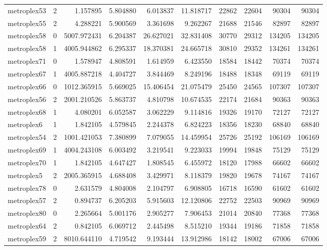 \begin{longtable}{|l|r|r|r|r|r|r|r|r|r|}
metroplex53 & 2 & 1.157895 & 5.804880 & 6.013837 & 11.818717 & 22862 & 22604 & 90304 & 90304 \\
metroplex55 & 2 & 4.288221 & 5.900569 & 3.361698 & 9.262267 & 21688 & 21546 & 82897 & 82897 \\
metroplex58 & 0 & 5007.972431 & 6.204387 & 26.627021 & 32.831408 & 30770 & 29312 & 134205 & 134205 \\
metroplex58 & 1 & 4005.944862 & 6.295337 & 18.370381 & 24.665718 & 30810 & 29352 & 134261 & 134261 \\
metroplex71 & 0 & 1.578947 & 4.808591 & 1.614959 & 6.423550 & 18584 & 18442 & 70374 & 70374 \\
metroplex67 & 1 & 4005.887218 & 4.404727 & 3.844469 & 8.249196 & 18488 & 18348 & 69119 & 69119 \\
metroplex66 & 0 & 1012.365915 & 5.669025 & 15.406454 & 21.075479 & 25450 & 24565 & 107307 & 107307 \\
metroplex56 & 2 & 2001.210526 & 5.863737 & 4.810798 & 10.674535 & 22174 & 21684 & 90363 & 90363 \\
metroplex68 & 1 & 4.080201 & 6.052587 & 3.062229 & 9.114816 & 19326 & 19170 & 72127 & 72127 \\
metroplex6 & 1 & 1.842105 & 4.579845 & 2.244378 & 6.824223 & 18356 & 18230 & 68840 & 68840 \\
metroplex54 & 2 & 1001.421053 & 7.380899 & 7.079055 & 14.459954 & 25726 & 25192 & 106169 & 106169 \\
metroplex69 & 1 & 4004.243108 & 6.003492 & 3.219541 & 9.223033 & 19994 & 19848 & 75129 & 75129 \\
metroplex70 & 1 & 1.842105 & 4.647427 & 1.808545 & 6.455972 & 18120 & 17988 & 66602 & 66602 \\
metroplex5 & 2 & 2005.365915 & 4.688408 & 3.429971 & 8.118379 & 19820 & 19678 & 74167 & 74167 \\
metroplex78 & 0 & 2.631579 & 4.804008 & 2.104797 & 6.908805 & 16718 & 16590 & 61602 & 61602 \\
metroplex57 & 2 & 0.894737 & 6.205203 & 5.915603 & 12.120806 & 22752 & 22503 & 90969 & 90969 \\
metroplex80 & 0 & 2.265664 & 5.001176 & 2.905277 & 7.906453 & 21014 & 20840 & 77368 & 77368 \\
metroplex64 & 2 & 0.842105 & 6.069712 & 2.445498 & 8.515210 & 19344 & 19186 & 71858 & 71858 \\
metroplex59 & 2 & 8010.644110 & 4.719542 & 9.193444 & 13.912986 & 18142 & 18002 & 67006 & 67006 \\

\end{longtable}
